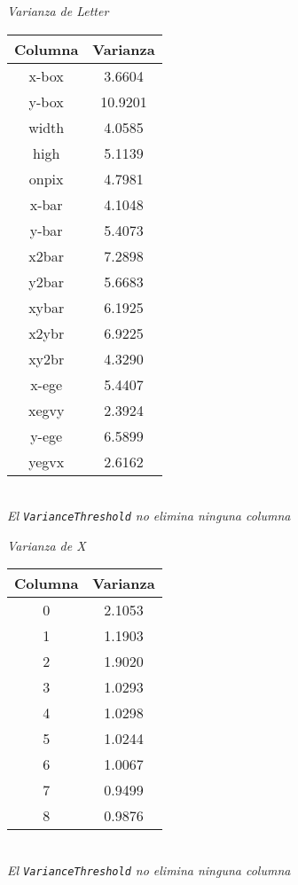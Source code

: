 \documentclass[
12pt, 
spanish, 
singlespacing,
headsepline
]{article}
\begin{document}
\begin{center}
\emph{Varianza de Letter}\\
\begin{tabular}{|c|c|}
\hline 
Columna & Varianza\\ 
\hline 
x-box & 3.6604\\
\hline
y-box & 10.9201\\
\hline
width & 4.0585\\
\hline
high & 5.1139\\
\hline
onpix & 4.7981\\
\hline
x-bar & 4.1048\\
\hline
y-bar & 5.4073\\
\hline
x2bar & 7.2898\\
\hline
y2bar & 5.6683\\
\hline
xybar & 6.1925\\
\hline
x2ybr & 6.9225\\
\hline
xy2br & 4.3290\\
\hline
x-ege & 5.4407\\
\hline
xegvy & 2.3924\\
\hline
y-ege & 6.5899\\
\hline
yegvx & 2.6162\\
\hline 
\end{tabular}\\

\textit{El \texttt{VarianceThreshold} no elimina ninguna columna}
\end{center}


\begin{center}
\emph{Varianza de X}\\
\begin{tabular}{|c|c|}
\hline 
Columna & Varianza\\ 
\hline 
0 & 2.1053\\ 
\hline 
1 & 1.1903\\ 
\hline 
2 & 1.9020\\ 
\hline 
3 & 1.0293\\ 
\hline 
4 & 1.0298\\ 
\hline 
5 & 1.0244\\ 
\hline 
6 & 1.0067\\ 
\hline 
7 & 0.9499\\ 
\hline 
8 & 0.9876\\ 
\hline 
\end{tabular}\\

\textit{El \texttt{VarianceThreshold} no elimina ninguna columna}
\end{center}
\end{document}
